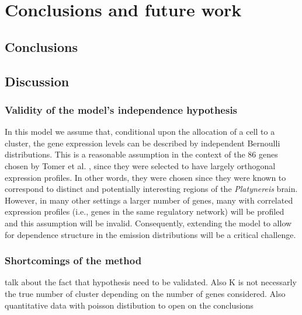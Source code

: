 \chapter{Conclusions and future work}\label{ch:conclusions}

\section{Conclusions}

	\section{Discussion}
		\subsection{Validity of the model's independence hypothesis}
		In this model we assume that, conditional upon the allocation of a cell to a cluster, the gene expression levels can be described by independent Bernoulli distributions. This is a reasonable assumption in the context of the 86 genes chosen by Tomer et al. \cite{Tomer10}, since they were selected to have largely orthogonal expression profiles. In other words, they were chosen since they were known to correspond to distinct and potentially interesting regions of the {\it{Platynereis}} brain. However, in many other settings a larger number of genes, many with correlated expression profiles (i.e., genes in the same regulatory network) will be profiled and this assumption will be invalid. Consequently, extending the model to allow for dependence structure in the emission distributions will be a critical challenge.
		\subsection{Shortcomings of the method}
		talk about the fact that hypothesis need to be validated. Also K is not necessarly the true number of cluster depending on the number of genes considered. Also quantitative data with poisson distibution to open on the conclusions
	



